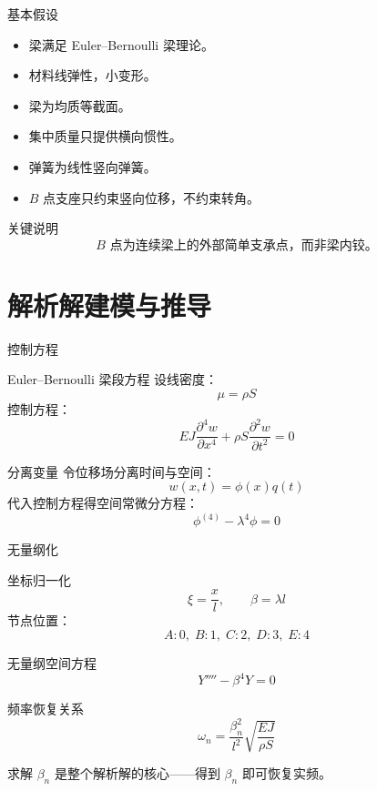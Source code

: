 \documentclass[UTF8,aspectratio=169,10pt]{ctexbeamer}
\begin{document}
\begin{frame}{基本假设}
  \begin{itemize}
    \item 梁满足 Euler--Bernoulli 梁理论。
    \item 材料线弹性，小变形。
    \item 梁为均质等截面。
    \item 集中质量只提供横向惯性。
    \item 弹簧为线性竖向弹簧。
    \item $B$ 点支座只约束竖向位移，不约束转角。
  \end{itemize}
  \vspace{1em}
  \begin{alertblock}{关键说明}
    \[
    B\text{ 点为连续梁上的外部简单支承点，而非梁内铰。}
    \]
  \end{alertblock}
\end{frame}

\section{解析解建模与推导}
\begin{frame}{控制方程}
  \begin{block}{Euler--Bernoulli 梁段方程}
    设线密度：
    \[
    \mu=\rho S
    \]
    控制方程：
    \[
    EJ\frac{\partial^4 w}{\partial x^4}
    +\rho S\frac{\partial^2 w}{\partial t^2}
    =0
    \]
  \end{block}
  \vspace{0.5em}
  \begin{block}{分离变量}
    令位移场分离时间与空间：
    \[
    w(x,t)=\phi(x)q(t)
    \]
    代入控制方程得空间常微分方程：
    \[
    \phi^{(4)}-\lambda^4\phi=0
    \]
  \end{block}
\end{frame}

\begin{frame}{无量纲化}
  \vspace{-0.3em}
  \begin{block}{坐标归一化}
    \[
    \xi=\frac{x}{l},\qquad
    \beta=\lambda l
    \]
    节点位置：
    \[
    A:0,\; B:1,\; C:2,\; D:3,\; E:4
    \]
  \end{block}
  \vspace{0.3em}
  \begin{block}{无量纲空间方程}
    \[
    Y''''-\beta^4Y=0
    \]
  \end{block}
  \vspace{0.3em}
  \begin{block}{频率恢复关系}
    \[
    \omega_n=
    \frac{\beta_n^2}{l^2}
    \sqrt{\frac{EJ}{\rho S}}
    \]
  \end{block}
  \vspace{0.6em}
  \centering
  求解 $\beta_n$ 是整个解析解的核心——得到 $\beta_n$ 即可恢复实频。
\end{frame}
\end{document}
